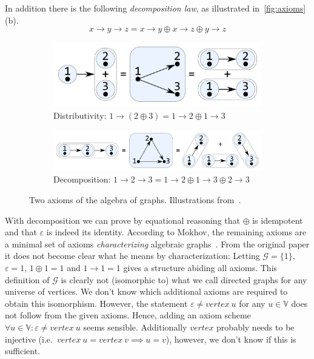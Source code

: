\documentclass{article}
\renewcommand{\epsilon}{\varepsilon}
\newcommand{\eps}{\epsilon}
\newcommand{\overlay}{\oplus}
\newcommand{\connect}{\rightarrow}
\begin{document}
In addition there is the following
\textit{decomposition law}, as illustrated in~\autoref{fig:axioms}(b).
\[
  x \connect y \connect z = x \connect y \overlay x \connect z \overlay y \connect z
\]
\begin{figure}
  \begin{subfigure}[b]{0.4\linewidth}
    \centerline{\includegraphics[scale=0.24]{fig/ax-distributivity.pdf}}
    \caption{Distributivity: $1 \connect (2 \overlay 3) = 1 \connect 2 \overlay
      1 \connect 3$ }
  \end{subfigure}
  \hspace{12mm}
  \begin{subfigure}[b]{0.5\linewidth}
    \centerline{\includegraphics[scale=0.24]{fig/ax-decomposition.pdf}}
    \caption{Decomposition: $1 \connect 2 \connect 3 = 1 \connect 2 \overlay
      {1 \connect 3} \overlay {2 \connect 3}$}
  \end{subfigure}
  \vspace{-1mm}
  \caption{Two axioms of the algebra of graphs. Illustrations from~\cite{mokhov2017algebraic}.\label{fig:axioms}}
\end{figure}
With decomposition we can prove by equational reasoning that $\overlay$ is
idempotent and that $\eps$ is indeed its identity.
According to Mokhov, the remaining axioms are a minimal set of axioms
\emph{characterizing} algebraic graphs~\cite{mokhov2017algebraic}. From the
original paper it does not become clear what he means by characterization:
Letting $\mathcal{G} = \{1\}$, $\eps = 1$, $1 \overlay 1 = 1$ and
$1\connect 1 = 1$ gives a structure abiding all axioms. This definition of
$\mathcal{G}$ is clearly not (isomorphic to) what we call directed graphs for
any universe of vertices.
We don't know which additional axioms are required to obtain this isomorphism.
However, the statement $\eps \neq vertex\ u$ for any $u \in \mathbb{V}$ does not
follow from the given axioms. Hence, adding an axiom scheme $\forall u \in
\mathbb{V}: \eps \neq vertex\ u$ seems sensible. Additionally $vertex$ probably
needs to be injective (i.e.\ $vertex\ u = vertex\ v \implies u = v$), however, we don't know if this
is sufficient.
\end{document}
